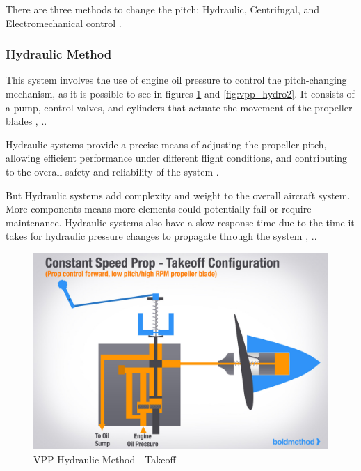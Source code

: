 There are three methods to change the pitch: Hydraulic, Centrifugal, and Electromechanical control \cite{VPP2}.

\subsubsection{Hydraulic Method}
This system involves the use of engine oil pressure to control the pitch-changing mechanism, as it is possible to see in figures \ref{fig:vpp_hydro1} and \ref{fig:vpp_hydro2}.
It consists of a pump, control valves, and cylinders that actuate the movement of the propeller blades \cite{VPP2}, \cite{VPP8}..

Hydraulic systems provide a precise means of adjusting the propeller pitch, allowing efficient performance under different flight conditions, and contributing to the overall safety and reliability of the system \cite{VPP5}.

But Hydraulic systems add complexity and weight to the overall aircraft system.
More components means more elements could potentially fail or require maintenance.
Hydraulic systems also have a slow response time due to the time it takes for hydraulic pressure changes to propagate through the system \cite{VPP2}, \cite{VPP8}..

\begin{figure}[H]
    \centering
    \includegraphics[scale=0.25]{ch2/assets/vpp_hydro1.jpg}
    \caption{VPP Hydraulic Method - Takeoff \cite{VPP5}}
    \label{fig:vpp_hydro1}
\end{figure}

